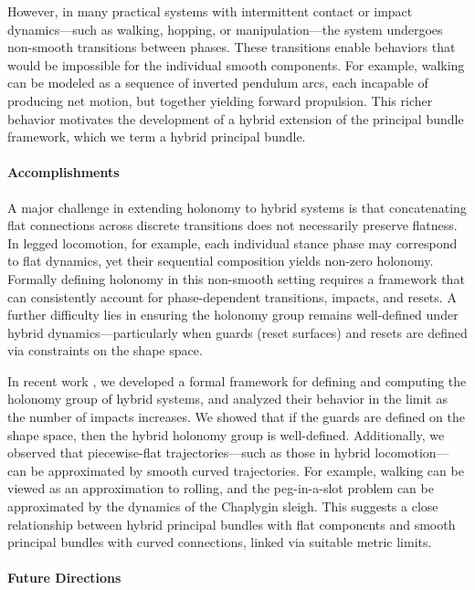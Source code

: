 \documentclass[letterpaper,11pt]{article}
\begin{document}
However, in many practical systems with intermittent contact or impact dynamics—such as walking, hopping, or manipulation—the system undergoes non-smooth transitions between phases. 
These transitions enable behaviors that would be impossible for the individual smooth components. 
For example, walking can be modeled as a sequence of inverted pendulum arcs, each incapable of producing net motion, but together yielding forward propulsion. 
This richer behavior motivates the development of a hybrid extension of the principal bundle framework, which we term a hybrid principal bundle.

\paragraph{Accomplishments}

A major challenge in extending holonomy to hybrid systems is that concatenating flat connections across discrete transitions does not necessarily preserve flatness. 
In legged locomotion, for example, each individual stance phase may correspond to flat dynamics, yet their sequential composition yields non-zero holonomy. 
Formally defining holonomy in this non-smooth setting requires a framework that can consistently account for phase-dependent transitions, impacts, and resets. 
A further difficulty lies in ensuring the holonomy group remains well-defined under hybrid dynamics—particularly when guards (reset surfaces) and resets are defined via constraints on the shape space.

In recent work \cite{hybrid_holonomy}, we developed a formal framework for defining and computing the holonomy group of hybrid systems, and analyzed their behavior in the limit as the number of impacts increases. 
We showed that if the guards are defined on the shape space, then the hybrid holonomy group is well-defined. 
Additionally, we observed that piecewise-flat trajectories—such as those in hybrid locomotion—can be approximated by smooth curved trajectories. 
For example, walking can be viewed as an approximation to rolling, and the peg-in-a-slot problem can be approximated by the dynamics of the Chaplygin sleigh. 
This suggests a close relationship between hybrid principal bundles with flat components and smooth principal bundles with curved connections, linked via suitable metric limits.

\paragraph{Future Directions}
\end{document}
